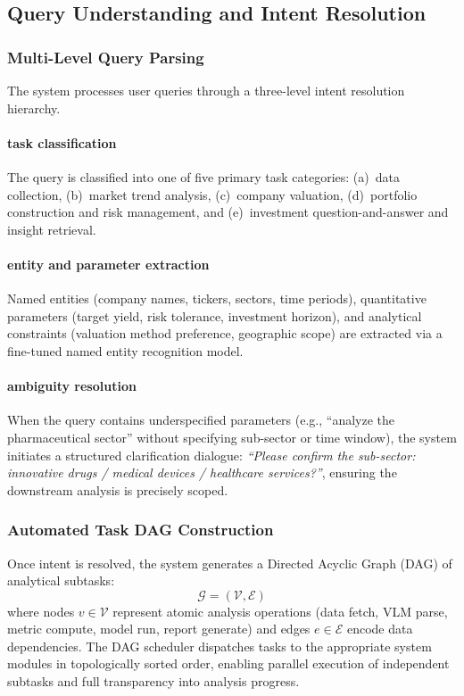 \documentclass[12pt,letterpaper]{article}
\begin{document}
\subsection{Query Understanding and Intent Resolution}

\subsubsection{Multi-Level Query Parsing}

The system processes user queries through a three-level intent resolution
hierarchy.

\paragraph{task classification}
The query is classified into one of five primary task categories:
(a)~data collection, (b)~market trend analysis, (c)~company valuation,
(d)~portfolio construction and risk management, and (e)~investment
question-and-answer and insight retrieval.

\paragraph{entity and parameter extraction}
Named entities (company names, tickers, sectors, time periods),
quantitative parameters (target yield, risk tolerance, investment
horizon), and analytical constraints (valuation method preference,
geographic scope) are extracted via a fine-tuned named entity
recognition model.

\paragraph{ambiguity resolution}
When the query contains underspecified parameters (e.g., ``analyze the
pharmaceutical sector'' without specifying sub-sector or time window),
the system initiates a structured clarification dialogue: \textit{``Please
confirm the sub-sector: innovative drugs / medical devices / healthcare
services?''}, ensuring the downstream analysis is precisely scoped.

\subsubsection{Automated Task DAG Construction}

Once intent is resolved, the system generates a Directed Acyclic Graph
(DAG) of analytical subtasks:
\begin{equation}
  \mathcal{G} = (\mathcal{V}, \mathcal{E})
  \label{eq:dag}
\end{equation}
where nodes $v \in \mathcal{V}$ represent atomic analysis operations
(data fetch, VLM parse, metric compute, model run, report generate) and
edges $e \in \mathcal{E}$ encode data dependencies.
The DAG scheduler dispatches tasks to the appropriate system modules in
topologically sorted order, enabling parallel execution of independent
subtasks and full transparency into analysis progress.
\end{document}
